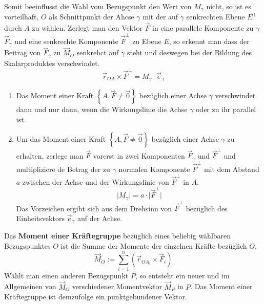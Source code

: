 Somit beeinflusst die Wahl vom Bezugspunkt den Wert von $M_{\gamma}$ nicht, so ist es vorteilhaft, $O$ als Schnittpunkt der Ahcse $\gamma$ mit der auf $\gamma$ senkrechten Ebene $E^{\perp}$ durch $A$ zu wählen. Zerlegt man den Vektor $\overrightarrow{F}$ in eine parallele Komponente zu $\gamma$ $\overrightarrow{F}_{\gamma}$ und eine senkrechte Komponente $\overrightarrow{F}^{\perp}$ zu Ebene $E$, so erkennt man dass der Beitrag von $\overrightarrow{F}_{\gamma}$ zu $\overrightarrow{M}_O$ senkrehct auf $\gamma$ steht und deswegen bei der Bildung des Skalarproduktes verschwindet.
\begin{equation} 
\boxed{\overrightarrow{r}_{OA}\times \overrightarrow{F}^{\perp}=M_{\gamma}\cdot \overrightarrow{e}_{\gamma}}
\end{equation} 
\begin{enumerate}[$(i)$]
\item Das Moment einer Kraft $\left\{A, \overrightarrow{F}\neq \overrightarrow{0}\right\}$ bezüglich einer Achse $\gamma$ verschwindet dann und nur dann, wenn die Wirkungslinie die Achse $\gamma$ oder zu ihr parallel ist.
\item Um das Moment einer Kraft $\left\{A, \overrightarrow{F}\neq \overrightarrow{0}\right\}$ bezüglich einer Achse $\gamma$ zu erhalten, zerlege man $\overrightarrow{F}$ vorerst in zwei Komponenten $\overrightarrow{F}_{\gamma}$ und $\overrightarrow{F}^{\perp}$ und multipliziere de Betrag der zu $\gamma$ normalen Komponente $\overrightarrow{F}^{\perp}$ mit dem Abstand $a$ zwischen der Achse und der Wirkungslinie von $\overrightarrow{F}^{\perp}$ in $A$.
\begin{equation}
\boxed{\Big\vert M_{\gamma}\Big\vert=a\cdot \Big\vert\overrightarrow{F}^{\perp}\Big\vert}
\end{equation}
Das Vorzeichen ergibt sich aus dem Drehsinn von $\overrightarrow{F}^{\perp}$ bezüglich des Einheitsvektors $\overrightarrow{e}_{\gamma}$ auf der Achse.
\end{enumerate}
Das \textbf{Moment einer Kräftegruppe} bezüglich eines beliebig wählbaren Bezugspunktes $O$ ist die Summe der Momente der einzelnen Kräfte bezüglich $O$.
\begin{equation}
\boxed{\overrightarrow{M}_O:=\displaystyle \sum_{i=1}^n\left(\overrightarrow{r}_{OA_i}\times \overrightarrow{F}_i\right)}
\end{equation}
Wählt man einen anderen Bezugspunkt $P$, so entsteht ein neuer und im Allgemeinen von $\overrightarrow{M}_O$ verschiedener Momentvektor $\overrightarrow{M}_P$ in $P$. Das Moment einer Kräftegruppe ist demzufolge ein punktgebundener Vektor.
